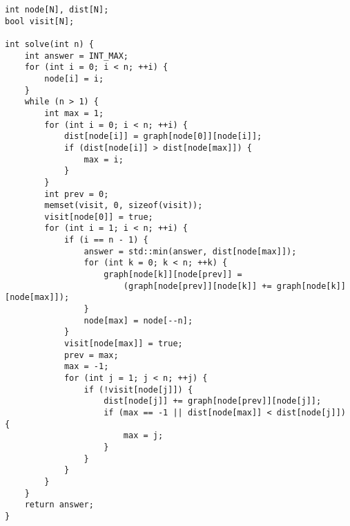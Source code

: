\begin{lstlisting}
int node[N], dist[N];
bool visit[N];

int solve(int n) {
    int answer = INT_MAX;
    for (int i = 0; i < n; ++i) {
        node[i] = i;
    }
    while (n > 1) {
        int max = 1;
        for (int i = 0; i < n; ++i) {
            dist[node[i]] = graph[node[0]][node[i]];
            if (dist[node[i]] > dist[node[max]]) {
                max = i;
            }
        }
        int prev = 0;
        memset(visit, 0, sizeof(visit));
        visit[node[0]] = true;
        for (int i = 1; i < n; ++i) {
            if (i == n - 1) {
                answer = std::min(answer, dist[node[max]]);
                for (int k = 0; k < n; ++k) {
                    graph[node[k]][node[prev]] =
                        (graph[node[prev]][node[k]] += graph[node[k]][node[max]]);
                }
                node[max] = node[--n];
            }
            visit[node[max]] = true;
            prev = max;
            max = -1;
            for (int j = 1; j < n; ++j) {
                if (!visit[node[j]]) {
                    dist[node[j]] += graph[node[prev]][node[j]];
                    if (max == -1 || dist[node[max]] < dist[node[j]]) {
                        max = j;
                    }
                }
            }
        }
    }
    return answer;
}
\end{lstlisting}
